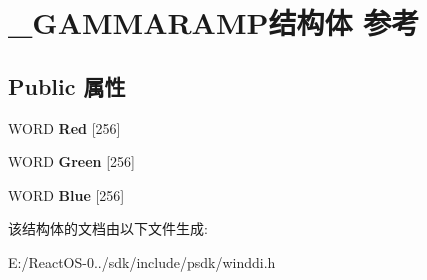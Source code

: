 \hypertarget{struct___g_a_m_m_a_r_a_m_p}{}\section{\+\_\+\+G\+A\+M\+M\+A\+R\+A\+M\+P结构体 参考}
\label{struct___g_a_m_m_a_r_a_m_p}
\subsection*{Public 属性}
\begin{DoxyCompactItemize}
\item 
\mbox{\label{struct___g_a_m_m_a_r_a_m_p_a1cef9220ac618d655439f714540bf3a3}} 
W\+O\+RD {\bfseries Red} \mbox{[}256\mbox{]}
\item 
\mbox{\label{struct___g_a_m_m_a_r_a_m_p_acf709ae94a12d6a2ca0e2d00fdbcbb1b}} 
W\+O\+RD {\bfseries Green} \mbox{[}256\mbox{]}
\item 
\mbox{\label{struct___g_a_m_m_a_r_a_m_p_ac47a21b488ff30a8bd4213c32706d986}} 
W\+O\+RD {\bfseries Blue} \mbox{[}256\mbox{]}
\end{DoxyCompactItemize}


该结构体的文档由以下文件生成\+:\begin{DoxyCompactItemize}
\item 
E\+:/\+React\+O\+S-\/0../sdk/include/psdk/winddi.\+h\end{DoxyCompactItemize}
